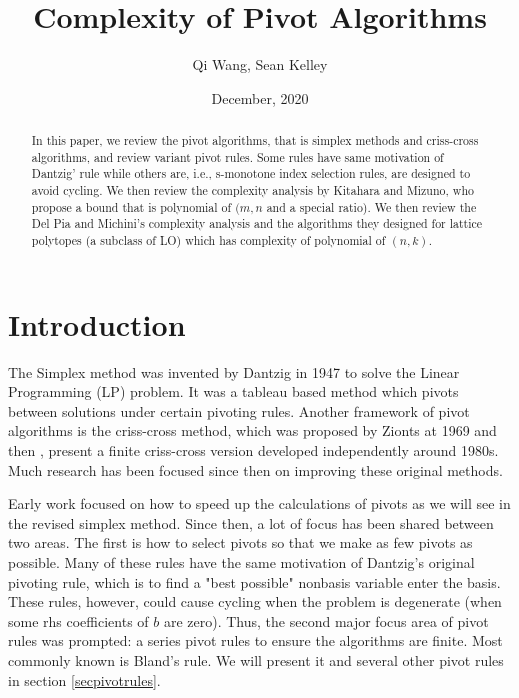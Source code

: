 \documentclass[11pt]{article}
\begin{document}
\newtheorem{theorem}{Theorem}
\newtheorem{corollary}{Corollary}
\newtheorem{lemma}{Lemma}
\newtheorem{definition}{Definition}
\DeclarePairedDelimiter{\norm}{\lVert}{\rVert} 

\title{Complexity of Pivot Algorithms}
\author{Qi Wang, Sean Kelley}
\date{December, 2020}
\maketitle


\begin{abstract}
In this paper, we review the pivot algorithms, that is simplex methods and criss-cross algorithms, and review variant pivot rules. Some rules have same motivation of Dantzig' rule while others are, i.e., s-monotone index selection rules, are designed to avoid cycling. We then review the complexity analysis by Kitahara and Mizuno, who propose a bound that is polynomial of $(m, n$ and a special ratio). We then review the Del Pia and Michini's complexity analysis and the algorithms they designed for lattice polytopes (a subclass of LO) which has complexity of polynomial of $(n,k)$.

\end{abstract}


\section{Introduction}
The Simplex method was invented by Dantzig in 1947 \cite{dantzig1951maximization} to solve the Linear Programming (LP) problem. It was a tableau based method which pivots between solutions under certain pivoting rules. Another framework of pivot algorithms is the criss-cross method, which was proposed by Zionts at 1969 \cite{fukuda1997criss} and then \cite{terlaky1987finite}, \cite{chang1979least} present a finite criss-cross version developed independently around 1980s. Much research has been focused since then on improving these original methods.

Early work focused on how to speed up the calculations of pivots as we will see in the revised simplex method. Since then, a lot of focus has been shared between two areas. The first is how to select pivots so that we make as few pivots as possible. Many of these rules have the same motivation of Dantzig's original pivoting rule, which is to find a "best possible" nonbasis variable enter the basis. These rules, however, could cause cycling when the problem is degenerate (when some rhs coefficients of $b$ are zero). Thus, the second major focus area of pivot rules was prompted: a series pivot rules to ensure the algorithms are finite. Most commonly known is Bland's rule. We will present it and several other pivot rules in section \ref{secpivotrules}.
\end{document}
